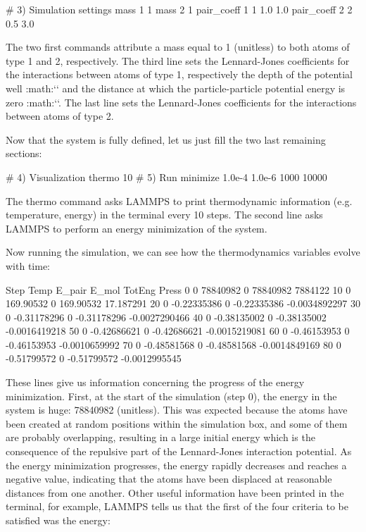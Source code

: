\begin{lcverbatim}
# 3) Simulation settings
mass 1 1
mass 2 1
pair_coeff 1 1 1.0 1.0
pair_coeff 2 2 0.5 3.0
\end{lcverbatim}

The two first commands attribute a mass
equal to 1 (unitless) to both atoms of type 1 and 2,
respectively. The third line sets the Lennard-Jones
coefficients for the interactions between atoms of type 1,
respectively the depth of the potential well
:math:`\epsilon` and the distance at which the
particle-particle potential energy is zero :math:`\sigma`. 
The last line sets the Lennard-Jones coefficients for
the interactions between atoms of type 2.

Now that the system is fully defined, let us just fill the two last remaining sections:

\begin{lcverbatim}
# 4) Visualization
thermo 10
# 5) Run
minimize 1.0e-4 1.0e-6 1000 10000
\end{lcverbatim}

The thermo command asks LAMMPS to print
thermodynamic information (e.g. temperature, energy) in the
terminal every 10 steps. The second line asks LAMMPS to
perform an energy minimization of the system.

Now running the simulation, we can see how the thermodynamics
variables evolve with time:

\begin{lcverbatim}
Step         Temp       E_pair        E_mol       TotEng         Press
0            0     78840982            0     78840982       7884122 
10            0    169.90532            0    169.90532     17.187291 
20            0  -0.22335386            0  -0.22335386 -0.0034892297 
30            0  -0.31178296            0  -0.31178296 -0.0027290466 
40            0  -0.38135002            0  -0.38135002 -0.0016419218 
50            0  -0.42686621            0  -0.42686621 -0.0015219081 
60            0  -0.46153953            0  -0.46153953 -0.0010659992 
70            0  -0.48581568            0  -0.48581568 -0.0014849169 
80            0  -0.51799572            0  -0.51799572 -0.0012995545 
\end{lcverbatim}

These lines give us information concerning
the progress of the energy minimization. First, at the start
of the simulation (step 0), the energy in the system is
huge: 78840982 (unitless). This was expected because
the atoms have been created at random positions within the
simulation box, and some of them are probably overlapping,
resulting in a large initial energy which is the consequence
of the repulsive part of the Lennard-Jones interaction
potential. As the energy minimization progresses, the energy
rapidly decreases and reaches a negative value, indicating that the atoms have been
displaced at reasonable distances from one another. Other
useful information have been printed in the terminal, for
example, LAMMPS tells us that the first of the four criteria
to be satisfied was the energy:

